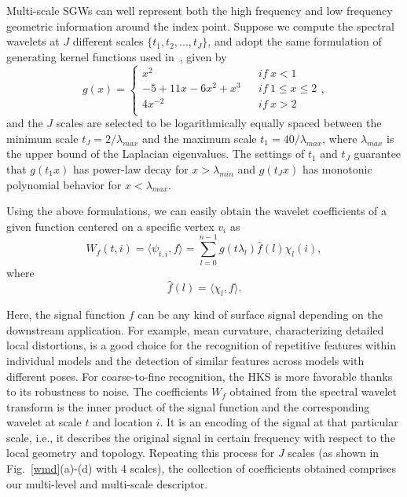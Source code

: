 Multi-scale SGWs can well represent both the high frequency and low frequency
geometric information around the index point.  Suppose we
compute the spectral wavelets at $J$ different scales $\{t_1,t_2,...,t_J\}$,
and adopt the same formulation of generating kernel functions used
in~\cite{Hammond2011}, given by
\begin{equation}
g(x)=\left\{
\begin{array}{lcl}
x^2                &      & {if\  x<1}\\
-5 +11x-6x^2 +x^3  &      & {if\  1 \leq x \leq 2}\\
4x^{-2}            &      & {if\  x>2}\\
\end{array} \right.,
\end{equation}
and the $J$ scales are selected to be logarithmically equally spaced
between the minimum scale $t_J = 2/\lambda_{max}$ and the maximum
scale $t_1=40/\lambda_{max}$, where $\lambda_{max}$ is the upper bound
of the Laplacian eigenvalues. The settings of $t_1$ and $t_J$
guarantee that $g(t_1 x)$ has power-law decay for $x>\lambda_{min}$
and $g(t_J x)$ has monotonic polynomial behavior for $x<\lambda_{max}$.

Using the above formulations, we can easily obtain the wavelet
coefficients of a given function centered on a specific vertex $v_i$ as
\begin{equation}
\label{eq:WMD}
W_f(t,i) = \langle \psi_{t,i},f \rangle = \sum_{l=0}^{n-1}g(t\lambda_l)\hat{f}(l)\chi_l(i),
\end{equation}
where
\begin{equation}
  \hat{f}(l) = \langle \chi_l,f \rangle.
\end{equation}

Here, the signal function $f$ can be any kind of surface signal
depending on the downstream application. For example, mean curvature,
characterizing detailed local distortions, is a good choice for the
recognition of repetitive features within individual models and the
detection of similar features across models with different poses.
For coarse-to-fine recognition, the HKS is more favorable thanks to
its robustness to noise. The coefficients $W_f$
obtained from the spectral wavelet transform is the inner product of the signal
function and the corresponding wavelet at scale $t$ and location $i$.
It is an encoding of the signal at that particular scale, i.e.,
it describes the original signal in certain frequency with respect to
the local geometry and topology. Repeating this process for $J$
scales (as shown in Fig.~\ref{wmd}(a)-(d) with 4 scales), the collection of
coefficients obtained comprises our multi-level and multi-scale descriptor.

